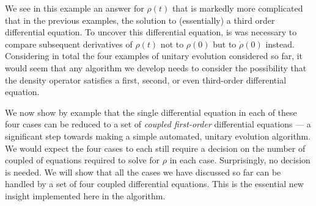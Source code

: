 We see in this example an answer for $\rho(t)$ that is markedly more complicated that in the previous examples, the solution to (essentially) a third order differential equation.  To uncover this differential equation, is was necessary to compare subsequent derivatives of $\rho(t)$ not to $\rho(0)$ but to $\dot{\rho}(0)$ instead.  Considering in total the four examples of unitary evolution considered so far, it would seem that any algorithm we develop needs to consider the possibility that the density operator satisfies a first, second, or even third-order differential equation. 

 We now show by example that the single differential equation in each of these four cases can be reduced to a set of \emph{coupled first-order} differential equations --- a significant step towards making a simple automated, unitary evolution algorithm.  We would expect the four cases to each still require a decision on the number of coupled of equations required to solve for $\rho$ in each case.  Surprisingly, no decision is needed.  We will show that all the cases we have discussed so far can be handled by a set of four coupled differential equations.  This is the essential new insight implemented here in the  algorithm. 

